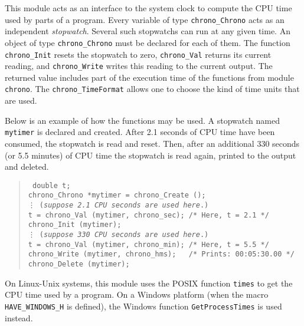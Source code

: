 
This module acts as an interface to the system clock to compute the
CPU time used by parts of a program.
Every variable of type {\tt chrono\_Chrono} acts as an independent 
{\em stopwatch}.  Several such stopwatchs can run at any given time.
An object of type {\tt chrono\_Chrono} must be declared 
for each of them.
The function {\tt chrono\_Init} resets the stopwatch to zero,
{\tt chrono\_Val\/} returns its current reading,
and {\tt chrono\_Write\/} writes this reading to the current output.
The returned value includes part of the execution time of the functions
from module {\tt chrono\/}.
The {\tt chrono\_TimeFormat} allows one to choose the kind of 
time units that are used.  

Below is an example of how the functions may be used.
A stopwatch named {\tt mytimer} is declared and created.
After 2.1 seconds of CPU time have been consumed, the stopwatch is read and
reset. Then, after an additional 330 seconds (or 5.5 minutes) of CPU time
the stopwatch is read again, printed to the output and deleted.
%
 \begin{verse}{\tt
  double t; \\
  chrono\_Chrono *mytimer = chrono\_Create (); \\
\hskip 1.0cm   \vdots 
\hskip 1.0cm  ({\em suppose 2.1 CPU seconds are used here}.)\\[6pt]
  t = chrono\_Val (mytimer, chrono\_sec); \qquad   /* Here, t = 2.1 */ \\
  chrono\_Init (mytimer); \\
\hskip 1.0cm  \vdots
\hskip 1.0cm ({\em suppose 330 CPU seconds are used here}.) \\[10pt]
  t = chrono\_Val (mytimer, chrono\_min); \qquad    /* Here, t = 5.5 */\\
  chrono\_Write (mytimer, chrono\_hms);  \qquad\ \  /* Prints: 00:05:30.00 */\\
  chrono\_Delete (mytimer);
 }\end{verse}


On Linux-Unix systems, this module uses the POSIX
function {\tt times} to get the CPU time used by a program.
  On a Windows platform (when the macro \texttt{HAVE\_WINDOWS\_H} is defined),
  the Windows function \texttt{GetProcessTimes} is used instead.

